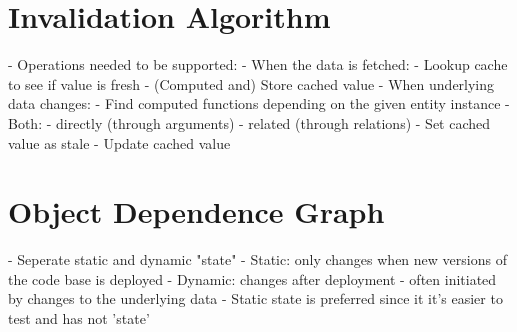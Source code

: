 \section{Invalidation Algorithm}
\label{sec:invalidation-algorithm}




- Operations needed to be supported:
  - When the data is fetched:
    - Lookup cache to see if value is fresh
    - (Computed and) Store cached value
  - When underlying data changes:
    - Find computed functions depending on the given entity instance
      - Both:
        - directly (through arguments)
        - related (through relations)
    - Set cached value as stale
    - Update cached value

\section{Object Dependence Graph}
\label{sec:object-dependence-graph}


- Seperate static and dynamic "state"
  - Static: only changes when new versions of the code base is deployed
  - Dynamic: changes after deployment - often initiated by changes to the
             underlying data
  - Static state is preferred since it it's easier to test and has not 'state'




